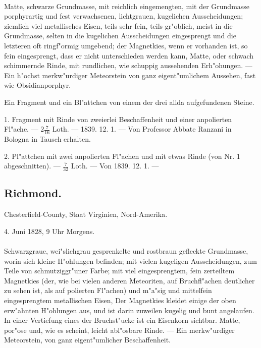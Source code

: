 \documentclass[a4paper, 11pt, oneside, polutonikogreek, german]{article}
\begin{document}
\paragraph{}
Matte, schwarze Grundmasse, mit reichlich eingemengten, mit der Grundmasse porphyrartig und fest verwachsenen, lichtgrauen, kugelichen Ausscheidungen; ziemlich viel metallisches Eisen, teils sehr fein, teils gr"oblich, meist in die Grundmasse, selten in die kugelichen Ausscheidungen eingesprengt und die letzteren oft ringf"ormig umgebend; der Magnetkies, wenn er vorhanden ist, so fein eingesprengt, dass er nicht unterschieden werden kann, Matte, oder schwach schimmernde Rinde, mit rundlichen, wie schuppig aussehenden Erh"ohungen. --- Ein h"ochst merkw"urdiger Meteorstein von ganz eigent"umlichem Aussehen, fast wie Obsidianporphyr.

Ein Fragment und ein Bl"attchen von einem der drei allda aufgefundenen Steine.

1. Fragment mit Rinde von zweierlei Beschaffenheit und einer anpolierten Fl"ache. --- $2\frac{7}{16}$ Loth. --- 1839. 12. 1. --- Von Professor Abbate Ranzani in Bologna in Tausch erhalten.

2. Pl"attchen mit zwei anpolierten Fl"achen und mit etwas Rinde (von Nr. 1 abgeschnitten). --- $\frac{7}{32}$ Loth. --- Von 1839. 12. 1. ---
\subsection{Richmond.}
\begin{center}
\small
Chesterfield-County, Staat Virginien, Nord-Amerika.

4. Juni 1828, 9 Uhr Morgens.
\end{center}
\paragraph{}
Schwarzgraue, wei"slichgrau gesprenkelte und rostbraun gefleckte Grundmasse, worin sich kleine H"ohlungen befinden; mit vielen kugeligen Ausscheidungen, zum Teile von schmutziggr"uner Farbe; mit viel eingesprengtem, fein zerteiltem Magnetkies (der, wie bei vielen anderen Meteoriten, auf Bruchfl"achen deutlicher zu sehen ist, als auf polierten Fl"achen) und m"a"sig und mittelfein eingesprengtem metallischen Eisen, Der Magnetkies kleidet einige der oben erw"ahnten H"ohlungen aus, und ist darin zuweilen kugelig und bunt angelaufen. In einer Vertiefung eines der Bruchst"ucke ist ein Eisenkorn sichtbar. Matte, por"ose und, wie es scheint, leicht abl"osbare Rinde. --- Ein merkw"urdiger Meteorstein, von ganz eigent"umlicher Beschaffenheit.
\end{document}
